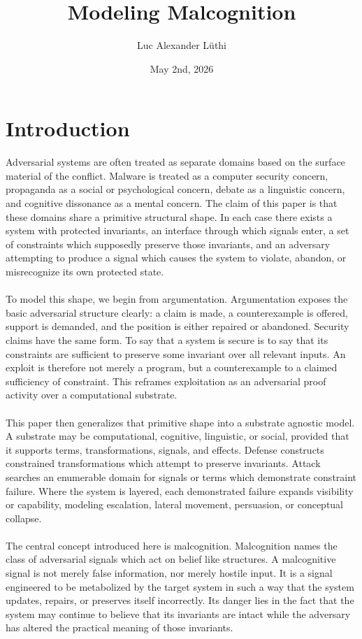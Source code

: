 \documentclass{article}
\title{Modeling Malcognition}
\author{Luc Alexander L{\"u}thi}
\date{May 2nd, 2026}
\begin{document}
	\maketitle
	\tableofcontents
	\section{Introduction}
	Adversarial systems are often treated as separate domains based on the surface material of the conflict. Malware is treated as a computer security concern, propaganda as a social or psychological concern, debate as a linguistic concern, and cognitive dissonance as a mental concern. The claim of this paper is that these domains share a primitive structural shape. In each case there exists a system with protected invariants, an interface through which signals enter, a set of constraints which supposedly preserve those invariants, and an adversary attempting to produce a signal which causes the system to violate, abandon, or misrecognize its own protected state.\\\\
	To model this shape, we begin from argumentation. Argumentation exposes the basic adversarial structure clearly: a claim is made, a counterexample is offered, support is demanded, and the position is either repaired or abandoned. Security claims have the same form. To say that a system is secure is to say that its constraints are sufficient to preserve some invariant over all relevant inputs. An exploit is therefore not merely a program, but a counterexample to a claimed sufficiency of constraint. This reframes exploitation as an adversarial proof activity over a computational substrate.\\\\
	This paper then generalizes that primitive shape into a substrate agnostic model. A substrate may be computational, cognitive, linguistic, or social, provided that it supports terms, transformations, signals, and effects. Defense constructs constrained transformations which attempt to preserve invariants. Attack searches an enumerable domain for signals or terms which demonstrate constraint failure. Where the system is layered, each demonstrated failure expands visibility or capability, modeling escalation, lateral movement, persuasion, or conceptual collapse.\\\\
	The central concept introduced here is malcognition. Malcognition names the class of adversarial signals which act on belief like structures. A malcognitive signal is not merely false information, nor merely hostile input. It is a signal engineered to be metabolized by the target system in such a way that the system updates, repairs, or preserves itself incorrectly. Its danger lies in the fact that the system may continue to believe that its invariants are intact while the adversary has altered the practical meaning of those invariants.\\\\
\end{document}
